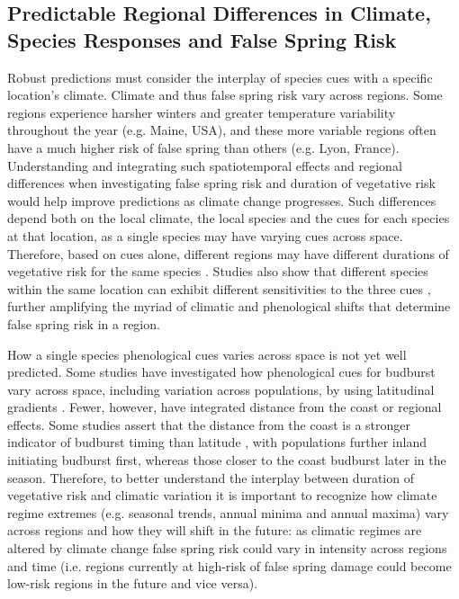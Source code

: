 \documentclass{article}\usepackage[]{graphicx}\usepackage[]{color}
\begin{document}
\subsection* {Predictable Regional Differences in Climate, Species Responses and False Spring Risk}
Robust predictions must consider the interplay of species cues with a specific location's climate. Climate and thus false spring risk vary across regions. Some regions experience harsher winters and greater temperature variability throughout the year (e.g. Maine, USA), and these more variable regions often have a much higher risk of false spring than others (e.g. Lyon, France). Understanding and integrating such spatiotemporal effects and regional differences when investigating false spring risk and duration of vegetative risk would help improve predictions as climate change progresses. Such differences depend both on the local climate, the local species and the cues for each species at that location, as a single species may have varying cues across space. Therefore, based on cues alone, different regions may have different durations of vegetative risk for the same species \citep {Partanen2004, Viheraaarnio2006, Caffarra2011}. Studies also show that different species within the same location can exhibit different sensitivities to the three cues \citep{Basler2012, Laube2013}, further amplifying the myriad of climatic and phenological shifts that determine false spring risk in a region. 

How a single species phenological cues varies across space is not yet well predicted. Some studies have investigated how phenological cues for budburst vary across space, including variation across populations, by using latitudinal gradients \citep{Sogaard2008, Way2015, Zohner2016, Gauzere2017}. Fewer, however, have integrated distance from the coast \citep [but see][]{Myking2007, Harrington2015, Aitken2015} or regional effects. Some studies assert that the distance from the coast is a stronger indicator of budburst timing than latitude \citep{Myking2007}, with populations further inland initiating budburst first, whereas those closer to the coast budburst later in the season. Therefore, to better understand the interplay between duration of vegetative risk and climatic variation it is important to recognize how climate regime extremes (e.g. seasonal trends, annual minima and annual maxima) vary across regions and how they will shift in the future: as climatic regimes are altered by climate change false spring risk could vary in intensity across regions and time (i.e. regions currently at high-risk of false spring damage could become low-risk regions in the future and vice versa). 
\end{document}

